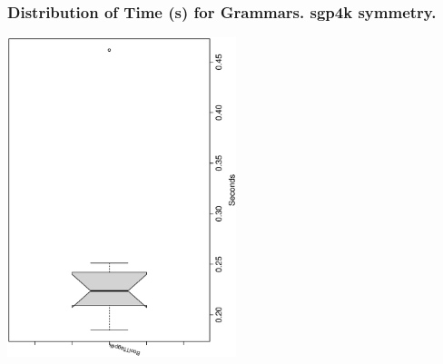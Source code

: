  \begin{frame}
 \frametitle{ Distribution of Time (s) for Grammars. sgp4k  symmetry. }
 \begin{center}
\includegraphics[width=0.5\textwidth, angle=-90]
{ExpFboxplottSeconds002.eps}
 \end{center}
 \label{ExpFboxplottSeconds002.eps}  
 \end{frame}

